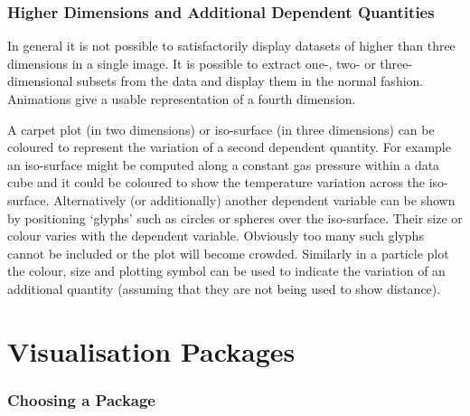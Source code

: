 \documentclass[twoside,11pt]{article}
\newcommand{\stardocinitials}  {SG}
\newcommand{\stardocnumber}    {8.2}
\newcommand{\stardocname}{\stardocinitials /\stardocnumber}
\newcommand{\xlabel}[1]{}
\begin{document}
\section{Higher Dimensions and Additional Dependent Quantities
\xlabel{HIGHER} }

In general it is not possible to satisfactorily display datasets of
higher than three dimensions in a single image. It is possible to extract
one-, two- or three-dimensional subsets from the data and display them in
the normal fashion. Animations give a usable representation of a fourth
dimension.

A carpet plot (in two dimensions) or iso-surface (in three dimensions)
can be coloured to represent the variation of a second dependent
quantity. For example an iso-surface might be computed along a constant
gas pressure within a data cube and it could be coloured to show the
temperature variation across the iso-surface. Alternatively (or
additionally) another dependent variable can be shown by positioning
`glyphs' such as circles or spheres over the iso-surface. Their size
or colour varies with the dependent variable. Obviously too many such
glyphs cannot be included or the plot will become crowded. Similarly in a
particle plot the colour, size and plotting symbol can be used to indicate
the variation of an additional quantity (assuming that they are not being
used to show distance).


\pagebreak
\markboth{\stardocname}{\stardocname}
\part{Visualisation Packages}
\markboth{\stardocname}{\stardocname}

\section{Choosing a Package \xlabel{CHOOSE} }
\end{document}
